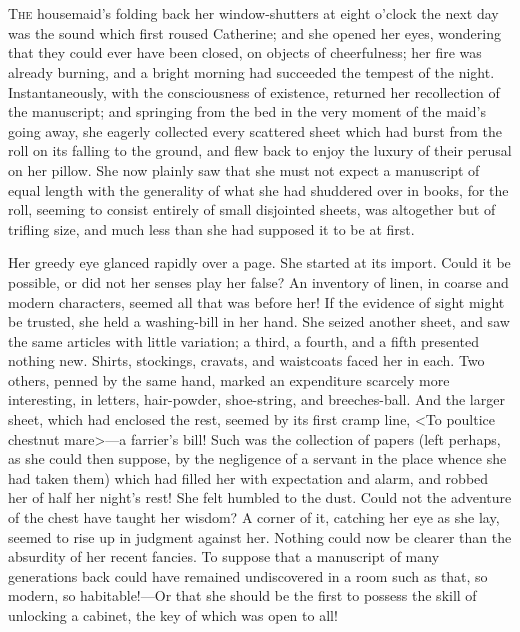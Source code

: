 \chapter[Chapter \thechapter]{} 

 \lettrine{T}{he} housemaid's folding back her window-shutters at eight o'clock the next day was the sound which first roused Catherine; and she opened her eyes, wondering that they could ever have been closed, on objects of cheerfulness; her fire was already burning, and a bright morning had succeeded the tempest of the night. Instantaneously, with the consciousness of existence, returned her recollection of the manuscript; and springing from the bed in the very moment of the maid's going away, she eagerly collected every scattered sheet which had burst from the roll on its falling to the ground, and flew back to enjoy the luxury of their perusal on her pillow. She now plainly saw that she must not expect a manuscript of equal length with the generality of what she had shuddered over in books, for the roll, seeming to consist entirely of small disjointed sheets, was altogether but of trifling size, and much less than she had supposed it to be at first. 

 Her greedy eye glanced rapidly over a page. She started at its import. Could it be possible, or did not her senses play her false? An inventory of linen, in coarse and modern characters, seemed all that was before her! If the evidence of sight might be trusted, she held a washing-bill in her hand. She seized another sheet, and saw the same articles with little variation; a third, a fourth, and a fifth presented nothing new. Shirts, stockings, cravats, and waistcoats faced her in each. Two others, penned by the same hand, marked an expenditure scarcely more interesting, in letters, hair-powder, shoe-string, and breeches-ball. And the larger sheet, which had enclosed the rest, seemed by its first cramp line, <To poultice chestnut mare>—a farrier's bill! Such was the collection of papers (left perhaps, as she could then suppose, by the negligence of a servant in the place whence she had taken them) which had filled her with expectation and alarm, and robbed her of half her night's rest! She felt humbled to the dust. Could not the adventure of the chest have taught her wisdom? A corner of it, catching her eye as she lay, seemed to rise up in judgment against her. Nothing could now be clearer than the absurdity of her recent fancies. To suppose that a manuscript of many generations back could have remained undiscovered in a room such as that, so modern, so habitable!—Or that she should be the first to possess the skill of unlocking a cabinet, the key of which was open to all! 

